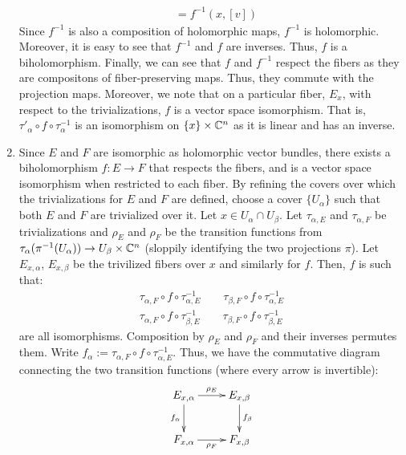 \documentclass[12pt]{article}
\begin{document}
\begin{solu}
\begin{enumerate}
\begin{align*}
            &= f^{-1}(x, [v])
        \end{align*}
        Since $f^{-1}$ is also a composition of holomorphic maps, $f^{-1}$ is holomorphic. Moreover, it is easy to see that $f^{-1}$ and $f$ are inverses. Thus, $f$ is a biholomorphism. \bbni
        Finally, we can see that $f$ and $f^{-1}$ respect the fibers as they are compositons of fiber-preserving maps. Thus, they commute with the projection maps. Moreover, we note that on a particular fiber, $E_x$, with respect to the trivializations, $f$ is a vector space isomorphism. That is, $\tau'_{\alpha} \circ f \circ \tau^{-1}_{\alpha}$ is an isomorphism on $\{x\} \times \mathbb C^n$ as it is linear and has an inverse.
        \item Since $E$ and $F$ are isomorphic as holomorphic vector bundles, there exists a biholomorphism $f: E \to F$ that respects the fibers, and is a vector space isomorphism when restricted to each fiber. \bbni
        By refining the covers over which the trivializations for $E$ and $F$ are defined, choose a cover $\{U_\alpha\}$ such that both $E$ and $F$ are trivialized over it. Let $x \in U_\alpha \cap U_\beta$. Let $\tau_{\alpha, E}$ and $\tau_{\alpha, F}$ be trivializations and $\rho_E$ and $\rho_F$ be the transition functions from $\tau_\alpha(\pi^{-1}(U_\alpha)) \to U_\beta \times \mathbb C^n$ (sloppily identifying the two projections $\pi$). Let $E_{x, \alpha}$, $E_{x, \beta}$ be the trivilized fibers over $x$ and similarly for $f$. Then, $f$ is such that:
        \begin{align*}
            \tau_{\alpha, F} \circ f \circ \tau_{\alpha, E}^{-1} \qquad \tau_{\beta, F} \circ f \circ \tau_{\alpha, E}^{-1}  \\
            \tau_{\alpha, F} \circ f \circ \tau_{\beta, E}^{-1} \qquad \tau_{\beta, F} \circ f \circ \tau_{\beta, E}^{-1}
        \end{align*} 
        are all isomorphisms. Composition by $\rho_E$ and $\rho_F$ and their inverses permutes them. Write $f_{\alpha} := \tau_{\alpha, F} \circ f \circ \tau_{\alpha, E}^{-1}$. Thus, we have the commutative diagram connecting the two transition functions (where every arrow is invertible):
        \[
            \xymatrix{ E_{x, \alpha} \ar[r]^{\rho_E} \ar[d]_{f_\alpha} & E_{x, \beta} \ar[d]^{f_\beta} \\
            F_{x, \alpha} \ar[r]_{\rho_F} & F_{x, \beta}}
        \]

\end{enumerate}
\end{solu}
\end{document}
